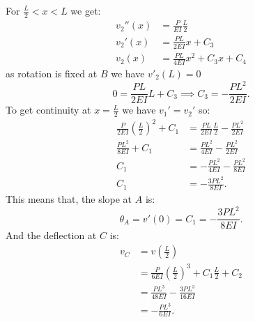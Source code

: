 \begin{derivation}
  For $\frac{L}{2}<x<L$ we get:
  \begin{align*}
    v_2''(x) &= \frac{P}{EI}\frac{L}{2} \\
    v_2'(x) &= \frac{PL}{2EI}x + C_3 \\
    v_2(x) &= \frac{PL}{4EI}x^2 + C_3 x + C_4
  \end{align*}
  as rotation is fixed at $B$ we have $v'_2(L) = 0$
  \begin{equation*}
    0 = \frac{PL}{2EI} L + C_3 \implies C_3 = - \frac{PL^2}{2EI}
  .\end{equation*}
  To get continuity at $x = \frac{L}{2}$ we have $v_1' = v_2'$ so:
  \begin{align*}
    \frac{P}{2EI} \left( \frac{L}{2} \right)^2 + C_1 &= \frac{PL}{2EI} \frac{L}{2} - \frac{PL^2}{2EI} \\
    \frac{PL^2}{8EI} + C_1 &= \frac{PL^2}{4EI} - \frac{PL^2}{2EI} \\
    C_1 &= - \frac{PL^2}{4EI} - \frac{PL^2}{8EI} \\
    C_1 &= - \frac{3PL^2}{8EI}
  .\end{align*}
  This means that, the slope at $A$ is:
  \begin{equation*}
    \theta_A = v'(0) = C_1 = - \frac{3PL^2}{8EI}
  .\end{equation*}
  And the deflection at $C$ is:
  \begin{align*}
    v_C &= v \left( \frac{L}{2} \right) \\
    &= \frac{P}{6EI} \left( \frac{L}{2} \right)^3 + C_1 \frac{L}{2} + C_2 \\
    &= \frac{PL^3}{48 EI} - \frac{3 PL^3}{16 EI} \\
    &= - \frac{PL^3}{6 EI}
  .\end{align*}
\end{derivation}

